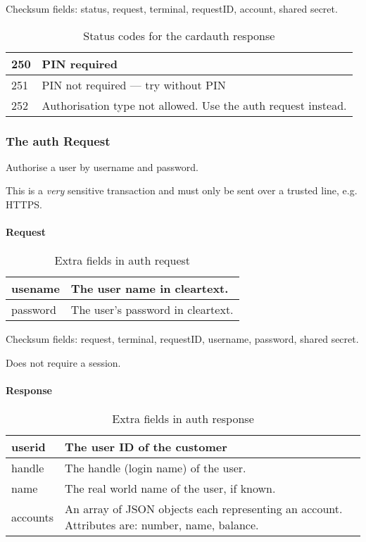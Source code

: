 \documentclass[a4paper,11pt]{article}
\newcommand{\code}[1]
   {\textsf{\mbox{#1}}}
\newcommand{\rightcellwidth}{25em}
\newcommand{\reqsection}[1]
    {\subsubsection{The \code{#1} Request}}
\newcommand{\partsection}[1]
           {\paragraph{#1}}
\begin{document}
Checksum fields: status, request, terminal, requestID, account, shared secret.


\begin{table}[!ht]
  \begin{tabular}{|l|p{\rightcellwidth}|}
    \hline
      250  & PIN required\\\hline
      251  & PIN not required --- try without PIN\\\hline
      252  & Authorisation type not allowed. Use the \code{auth}
      request instead.\\\hline
  \end{tabular} 
  \caption{Status codes for the \code{cardauth} response}
\end{table}



\reqsection{auth}

Authorise a user by username and password.

This is a \emph{very} sensitive transaction and must only be sent
over a trusted line, e.g. HTTPS.

\partsection{Request}
\begin{table}[!ht]
  \begin{tabular}{|l|p{\rightcellwidth}|}
    \hline
    usename & The user name in cleartext.\\\hline
    password & The user's password in cleartext.\\\hline
  \end{tabular} 
  \caption{Extra fields in \code{auth} request}
\end{table}

Checksum fields: request, terminal, requestID, username, password,
shared secret. 

Does not require a session.

\partsection{Response}
\begin{table}[!ht]
  \begin{tabular}{|l|p{\rightcellwidth}|}
    \hline
      userid  & The user ID of the customer \\\hline
      handle  & The handle (login name) of the user.\\\hline
      name    & The real world name of the user, if known.\\\hline
      accounts & An array of JSON objects each representing
                 an account. Attributes are: number, name, balance.\\\hline
       
  \end{tabular} 
  \caption{Extra fields in \code{auth} response}
\end{table}
\end{document}

